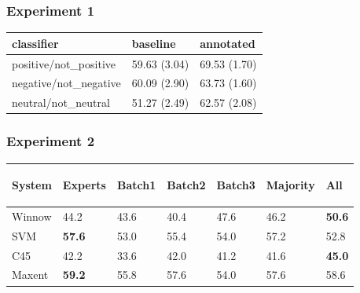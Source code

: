 \documentclass[10pt]{beamer}
\begin{document}
\begin{frame}
  \frametitle{Experiment 1}

\begin{center}
\begin{tabular}{|l|l|l|}
\hline
classifier &baseline &annotated \\ 
\hline
positive/not\_positive &59.63 (3.04) &69.53 (1.70) \\ 
\hline
negative/not\_negative &60.09 (2.90) &63.73 (1.60) \\ 
\hline
neutral/not\_neutral &51.27 (2.49) &62.57 (2.08) \\ 
\hline
\end{tabular}
\end{center}

\end{frame}

\begin{frame}
  \frametitle{Experiment 2}
\begin{center}
\begin{small}
\begin{tabular}{|l|l|l|l|l|l|l|} \hline
 System & 
 {\begin{sideways}\parbox{2cm}{\centering Experts}\end{sideways}} &
 {\begin{sideways}\parbox{2cm}{\centering Batch1}\end{sideways}} &
 {\begin{sideways}\parbox{2cm}{\centering Batch2}\end{sideways}} &
 {\begin{sideways}\parbox{2cm}{\centering Batch3}\end{sideways}} &
 {\begin{sideways}\parbox{2cm}{\centering Majority}\end{sideways}} &
 {\begin{sideways}\parbox{2cm}{\centering All}\end{sideways}} \\ \hline
 Winnow & 44.2 & 43.6 & 40.4 & 47.6 & 46.2 & \textbf{50.6} \\ \hline
 SVM & \textbf{57.6} & 53.0 & 55.4 & 54.0 & 57.2 & 52.8 \\ \hline
 C45 & 42.2 & 33.6 & 42.0 & 41.2 & 41.6 & \textbf{45.0} \\ \hline
 Maxent & \textbf{59.2} & 55.8 & 57.6 & 54.0 & 57.6 & 58.6 \\ \hline
\end{tabular}
\end{small}
\end{center}
\end{frame}
\end{document}
